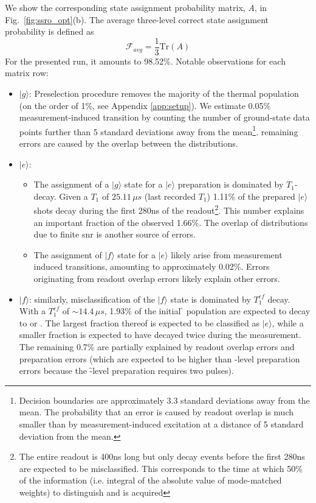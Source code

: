 We show the corresponding state assignment probability matrix, $A$, in Fig.~\ref{fig:ssro_opt}(b). The average three-level correct state assignment probability is defined as
\begin{equation}
    \mathcal{F}_{avg} = \frac{1}{3}\mathrm{Tr}(A)
\end{equation}
For the presented run, it amounts to 98.52\%. Notable observations for each matrix row:
\begin{itemize}
    \item $|g\rangle$: Preselection procedure removes the majority of the thermal population (on the order of 1\%, see Appendix \ref{app:setup}). We estimate 0.05\% measurement-induced transition by counting the number of ground-state data points further than 5 standard deviations away from the mean\footnote{Decision boundaries are approximately 3.3 standard deviations away from the mean. The probability that an error is caused by readout overlap is much smaller than by measurement-induced excitation at a distance of 5 standard deviation from the mean.}. remaining errors are caused by the overlap between the distributions.
    \item $|e\rangle$: 
    \begin{itemize}
        \item The assignment of a $|g\rangle$ state for a $|e\rangle$ preparation is dominated by $T_1$-decay. Given a $T_1$ of $25.11\, \mu s$ (last recorded $T_1$) 1.11\% of the prepared $|e\rangle$ shots decay during the first 280\unit{ns} of the readout\footnote{The entire readout is 400\unit{ns} long but only decay events before the first 280\unit{ns} are expected to be misclassified. This corresponds to the time at which 50\% of the information (i.e. integral of the absolute value of mode-matched weights) to distinguish \g{} and \e{} is acquired}. This number explains an important fraction of the observed 1.66\%. 
        The overlap of distributions due to finite \gls{snr} is another source of errors.
        \item The assignment of $|f\rangle$ state for a $|e\rangle$ likely arise from measurement induced transitions, amounting to approximately 0.02\%. Errors originating from readout overlap errors likely explain other errors. 
    \end{itemize}
    \item $|f\rangle$: similarly, misclassification of the $|f\rangle$ state is dominated by $T_1^{ef}$ decay. With a $T_1^{ef}$ of $\sim14.4\, \mu s$,  1.93\% of the initial \f{} population are expected to decay to \e{} or \g. The largest fraction thereof is expected to be classified as $|e\rangle$, while a smaller fraction is expected to have decayed twice during the measurement. The remaining 0.7\% are partially explained by readout overlap errors and preparation errors (which are expected to be higher than \e-level preparation errors because the \f-level preparation requires two pulses).
\end{itemize}

